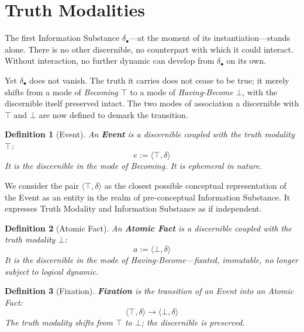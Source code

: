 \documentclass[11pt, a4paper]{article}
\theoremstyle{formalism}
\newtheorem{formalism}{Definition}
\begin{document}
\section{Truth Modalities}

The first Information Substance $\delta_\bullet$---at the moment of its
instantiation---stands alone. There is no other discernible, no counterpart
with which it could interact. Without interaction, no further dynamic can
develop from $\delta_\bullet$ on its own.

Yet $\delta_\bullet$ does not vanish. The truth it carries does not cease to be
true; it merely shifts from a mode of \textit{Becoming} $\top$ to a mode of
\textit{Having-Become} $\bot$, with the discernible itself preserved intact.
The two modes of association a discernible with $\top$ and $\bot$ are 
now defined to demark the transition. 

\begin{formalism}[Event]
    An \textbf{Event} is a discernible coupled with the truth modality $\top$:
    \begin{equation}
        e := \langle \top, \delta \rangle
    \end{equation}
    It is the discernible in the mode of \textit{Becoming}. It is
    \textit{ephemeral} in nature.
\end{formalism}

We consider the pair $\langle \top, \delta \rangle$ as the closest possible
conceptual representation of the Event as an entity in the realm of
pre-conceptual Information Substance. It expresses Truth Modality and
Information Substance as if independent.

\begin{formalism}[Atomic Fact]
    An \textbf{Atomic Fact} is a discernible coupled with the truth modality
    $\bot$:
    \begin{equation}
        a := \langle \bot, \delta \rangle
    \end{equation}
    It is the discernible in the mode of \textit{Having-Become}---fixated,
    immutable, no longer subject to logical dynamic.
\end{formalism}

\begin{formalism}[Fixation]
    \textbf{Fixation} is the transition of an Event into an Atomic Fact:
    \begin{equation}
        \langle \top, \delta \rangle \rightarrow \langle \bot, \delta \rangle
    \end{equation}
    The truth modality shifts from $\top$ to $\bot$; the discernible is
    preserved.
\end{formalism}
\end{document}
